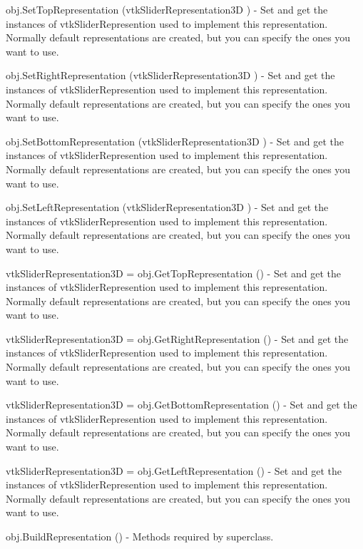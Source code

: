 \begin{DoxyItemize}
\item {\ttfamily obj.\-Set\-Top\-Representation (vtk\-Slider\-Representation3\-D )} -\/ Set and get the instances of vtk\-Slider\-Represention used to implement this representation. Normally default representations are created, but you can specify the ones you want to use.  
\item {\ttfamily obj.\-Set\-Right\-Representation (vtk\-Slider\-Representation3\-D )} -\/ Set and get the instances of vtk\-Slider\-Represention used to implement this representation. Normally default representations are created, but you can specify the ones you want to use.  
\item {\ttfamily obj.\-Set\-Bottom\-Representation (vtk\-Slider\-Representation3\-D )} -\/ Set and get the instances of vtk\-Slider\-Represention used to implement this representation. Normally default representations are created, but you can specify the ones you want to use.  
\item {\ttfamily obj.\-Set\-Left\-Representation (vtk\-Slider\-Representation3\-D )} -\/ Set and get the instances of vtk\-Slider\-Represention used to implement this representation. Normally default representations are created, but you can specify the ones you want to use.  
\item {\ttfamily vtk\-Slider\-Representation3\-D = obj.\-Get\-Top\-Representation ()} -\/ Set and get the instances of vtk\-Slider\-Represention used to implement this representation. Normally default representations are created, but you can specify the ones you want to use.  
\item {\ttfamily vtk\-Slider\-Representation3\-D = obj.\-Get\-Right\-Representation ()} -\/ Set and get the instances of vtk\-Slider\-Represention used to implement this representation. Normally default representations are created, but you can specify the ones you want to use.  
\item {\ttfamily vtk\-Slider\-Representation3\-D = obj.\-Get\-Bottom\-Representation ()} -\/ Set and get the instances of vtk\-Slider\-Represention used to implement this representation. Normally default representations are created, but you can specify the ones you want to use.  
\item {\ttfamily vtk\-Slider\-Representation3\-D = obj.\-Get\-Left\-Representation ()} -\/ Set and get the instances of vtk\-Slider\-Represention used to implement this representation. Normally default representations are created, but you can specify the ones you want to use.  
\item {\ttfamily obj.\-Build\-Representation ()} -\/ Methods required by superclass.  

\end{DoxyItemize}
